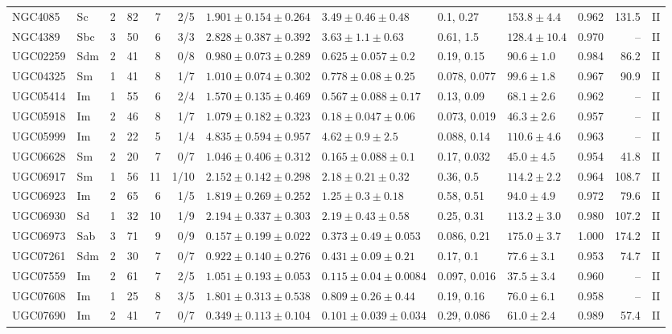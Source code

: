\documentclass[10pt]{article}
\begin{document}
\begin{landscape}
{\begin{longtable}{llrrrrlllllrc}
NGC4085 & Sc & 2 & 82 & 7 & 2/5 & $1.901\pm0.154\pm0.264$ & $3.49\pm0.46\pm0.48$ & 0.1, 0.27 & $153.8\pm4.4$ & 0.962 & 131.5 & II\\
NGC4389 & Sbc & 3 & 50 & 6 & 3/3 & $2.828\pm0.387\pm0.392$ & $3.63\pm1.1\pm0.63$ & 0.61, 1.5 & $128.4\pm10.4$ & 0.970 & -- & II\\
UGC02259 & Sdm & 2 & 41 & 8 & 0/8 & $0.980\pm0.073\pm0.289$ & $0.625\pm0.057\pm0.2$ & 0.19, 0.15 & $90.6\pm1.0$ & 0.984 & 86.2 & II\\
UGC04325 & Sm & 1 & 41 & 8 & 1/7 & $1.010\pm0.074\pm0.302$ & $0.778\pm0.08\pm0.25$ & 0.078, 0.077 & $99.6\pm1.8$ & 0.967 & 90.9 & II\\
UGC05414 & Im & 1 & 55 & 6 & 2/4 & $1.570\pm0.135\pm0.469$ & $0.567\pm0.088\pm0.17$ & 0.13, 0.09 & $68.1\pm2.6$ & 0.962 & -- & II\\
UGC05918 & Im & 2 & 46 & 8 & 1/7 & $1.079\pm0.182\pm0.323$ & $0.18\pm0.047\pm0.06$ & 0.073, 0.019 & $46.3\pm2.6$ & 0.957 & -- & II\\
UGC05999 & Im & 2 & 22 & 5 & 1/4 & $4.835\pm0.594\pm0.957$ & $4.62\pm0.9\pm2.5$ & 0.088, 0.14 & $110.6\pm4.6$ & 0.963 & -- & II\\
UGC06628 & Sm & 2 & 20 & 7 & 0/7 & $1.046\pm0.406\pm0.312$ & $0.165\pm0.088\pm0.1$ & 0.17, 0.032 & $45.0\pm4.5$ & 0.954 & 41.8 & II\\
UGC06917 & Sm & 1 & 56 & 11 & 1/10 & $2.152\pm0.142\pm0.298$ & $2.18\pm0.21\pm0.32$ & 0.36, 0.5 & $114.2\pm2.2$ & 0.964 & 108.7 & II\\
UGC06923 & Im & 2 & 65 & 6 & 1/5 & $1.819\pm0.269\pm0.252$ & $1.25\pm0.3\pm0.18$ & 0.58, 0.51 & $94.0\pm4.9$ & 0.972 & 79.6 & II\\
UGC06930 & Sd & 1 & 32 & 10 & 1/9 & $2.194\pm0.337\pm0.303$ & $2.19\pm0.43\pm0.58$ & 0.25, 0.31 & $113.2\pm3.0$ & 0.980 & 107.2 & II\\
UGC06973 & Sab & 3 & 71 & 9 & 0/9 & $0.157\pm0.199\pm0.022$ & $0.373\pm0.49\pm0.053$ & 0.086, 0.21 & $175.0\pm3.7$ & 1.000 & 174.2 & II\\
UGC07261 & Sdm & 2 & 30 & 7 & 0/7 & $0.922\pm0.140\pm0.276$ & $0.431\pm0.09\pm0.21$ & 0.17, 0.1 & $77.6\pm3.1$ & 0.953 & 74.7 & II\\
UGC07559 & Im & 2 & 61 & 7 & 2/5 & $1.051\pm0.193\pm0.053$ & $0.115\pm0.04\pm0.0084$ & 0.097, 0.016 & $37.5\pm3.4$ & 0.960 & -- & II\\
UGC07608 & Im & 1 & 25 & 8 & 3/5 & $1.801\pm0.313\pm0.538$ & $0.809\pm0.26\pm0.44$ & 0.19, 0.16 & $76.0\pm6.1$ & 0.958 & -- & II\\
UGC07690 & Im & 2 & 41 & 7 & 0/7 & $0.349\pm0.113\pm0.104$ & $0.101\pm0.039\pm0.034$ & 0.29, 0.086 & $61.0\pm2.4$ & 0.989 & 57.4 & II\\

\end{longtable}}
\end{landscape}
\end{document}
